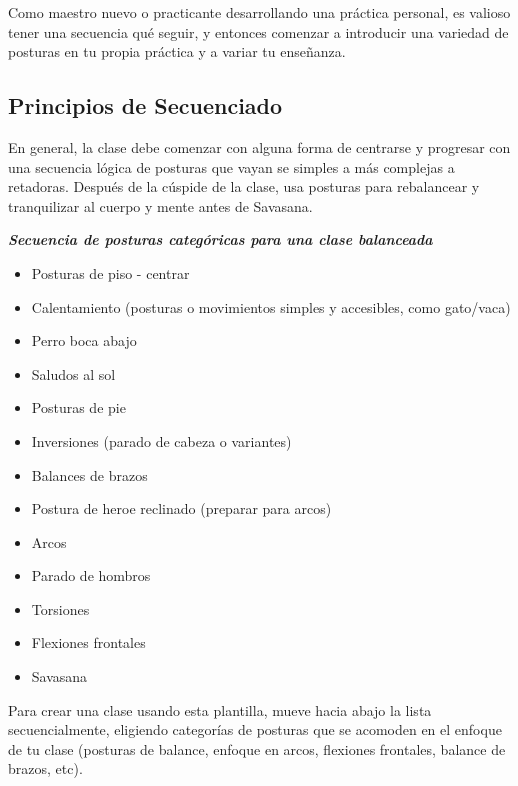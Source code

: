 Como maestro nuevo o practicante desarrollando una práctica personal, es valioso tener una secuencia qu\'e seguir, y entonces comenzar a introducir una variedad de posturas en tu propia práctica y a variar tu enseñanza.

\subsection{Principios de Secuenciado}
En general, la clase debe comenzar con alguna forma de centrarse y progresar con una secuencia lógica de posturas que vayan se simples a más complejas a retadoras. Despu\'es de la cúspide de la clase, usa posturas para rebalancear y tranquilizar al cuerpo y mente antes de Savasana.

\textbf{\textit{Secuencia de posturas categóricas para una clase balanceada}}

\begin{itemize}
	\item Posturas de piso - centrar
	\item Calentamiento (posturas o movimientos simples y accesibles, como gato/vaca)
	\item Perro boca abajo
	\item Saludos al sol
	\item Posturas de pie
	\item Inversiones (parado de cabeza o variantes)
	\item Balances de brazos
	\item Postura de heroe reclinado (preparar para arcos)
	\item Arcos
	\item Parado de hombros
	\item Torsiones
	\item Flexiones frontales
	\item Savasana
\end{itemize}

Para crear una clase usando esta plantilla, mueve hacia abajo la lista secuencialmente, eligiendo categorías de posturas que se acomoden en el enfoque de tu clase (posturas de balance, enfoque en arcos, flexiones frontales, balance de brazos, etc).

